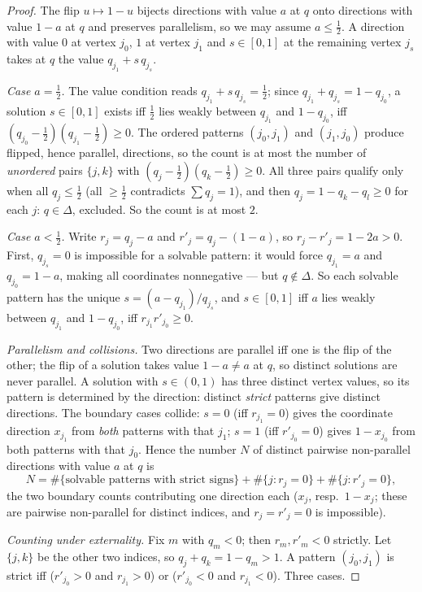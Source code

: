 \documentclass{aims}
\numberwithin{equation}{section}
\theoremstyle{plain}
\theoremstyle{definition}
\theoremstyle{remark}
\begin{document}
\begin{proof}
The flip $u\mapsto1-u$ bijects directions with value $a$ at $q$ onto
directions with value $1-a$ at $q$ and preserves parallelism, so we may
assume $a\le\tfrac12$. A direction with value $0$ at vertex $j_0$, $1$ at
vertex $j_1$ and $s\in[0,1]$ at the remaining vertex $j_s$ takes at $q$ the
value $q_{j_1}+s\,q_{j_s}$.

\emph{Case $a=\tfrac12$.} The value condition reads
$q_{j_1}+s\,q_{j_s}=\tfrac12$; since $q_{j_1}+q_{j_s}=1-q_{j_0}$, a solution
$s\in[0,1]$ exists iff $\tfrac12$ lies weakly between $q_{j_1}$ and
$1-q_{j_0}$, iff $(q_{j_0}-\tfrac12)(q_{j_1}-\tfrac12)\ge0$. The ordered
patterns $(j_0,j_1)$ and $(j_1,j_0)$ produce flipped, hence parallel,
directions, so the count is at most the number of \emph{unordered} pairs
$\{j,k\}$ with $(q_j-\tfrac12)(q_k-\tfrac12)\ge0$. All three pairs qualify
only when all $q_j\le\tfrac12$ (all $\ge\tfrac12$ contradicts $\sum q_j=1$),
and then $q_j=1-q_k-q_l\ge0$ for each $j$: $q\in\Delta$, excluded. So the
count is at most $2$.

\emph{Case $a<\tfrac12$.} Write $r_j=q_j-a$ and $r'_j=q_j-(1-a)$, so
$r_j-r'_j=1-2a>0$. First, $q_{j_s}=0$ is impossible for a solvable pattern:
it would force $q_{j_1}=a$ and $q_{j_0}=1-a$, making all coordinates
nonnegative --- but $q\notin\Delta$. So each solvable pattern has the unique
$s=(a-q_{j_1})/q_{j_s}$, and $s\in[0,1]$ iff $a$ lies weakly between
$q_{j_1}$ and $1-q_{j_0}$, iff $r_{j_1}r'_{j_0}\ge0$.

\emph{Parallelism and collisions.} Two directions are parallel iff one is
the flip of the other; the flip of a solution takes value $1-a\ne a$ at $q$,
so distinct solutions are never parallel. A solution with $s\in(0,1)$ has
three distinct vertex values, so its pattern is determined by the direction:
distinct \emph{strict} patterns give distinct directions. The boundary cases
collide: $s=0$ (iff $r_{j_1}=0$) gives the coordinate direction $x_{j_1}$
from \emph{both} patterns with that $j_1$; $s=1$ (iff $r'_{j_0}=0$) gives
$1-x_{j_0}$ from both patterns with that $j_0$. Hence the number $N$ of
distinct pairwise non-parallel directions with value $a$ at $q$ is
\[
N=\#\{\text{solvable patterns with strict signs}\}
+\#\{j:r_j=0\}+\#\{j:r'_j=0\},
\]
the two boundary counts contributing one direction each ($x_j$, resp.\
$1-x_j$; these are pairwise non-parallel for distinct indices, and
$r_j=r'_j=0$ is impossible).

\emph{Counting under externality.} Fix $m$ with $q_m<0$; then $r_m,r'_m<0$
strictly. Let $\{j,k\}$ be the other two indices, so $q_j+q_k=1-q_m>1$. A
pattern $(j_0,j_1)$ is strict iff ($r'_{j_0}>0$ and $r_{j_1}>0$) or
($r'_{j_0}<0$ and $r_{j_1}<0$). Three cases.


\end{proof}
\end{document}
